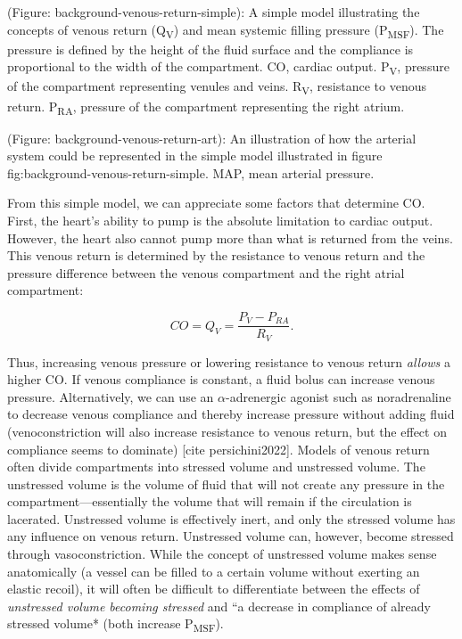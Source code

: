 \documentclass[a4paper, nobind]{templates/ociamthesis}
\begin{document}
(Figure: background-venous-return-simple): A simple model illustrating the concepts of venous return (Q\textsubscript{V}) and mean systemic filling pressure (P\textsubscript{MSF}). The pressure is defined by the height of the fluid surface and the compliance is proportional to the width of the compartment. CO, cardiac output. P\textsubscript{V}, pressure of the compartment representing venules and veins. R\textsubscript{V}, resistance to venous return. P\textsubscript{RA}, pressure of the compartment representing the right atrium.

(Figure: background-venous-return-art): An illustration of how the arterial system could be represented in the simple model illustrated in figure fig:background-venous-return-simple. MAP, mean arterial pressure.

From this simple model, we can appreciate some factors that determine CO. First, the heart's ability to pump is the absolute limitation to cardiac output. However, the heart also cannot pump more than what is returned from the veins. This venous return is determined by the resistance to venous return and the pressure difference between the venous compartment and the right atrial compartment:

\[
CO = Q_V = \frac{P_V - P_{RA}}{R_V}.
\]

Thus, increasing venous pressure or lowering resistance to venous return \emph{allows} a higher CO. If venous compliance is constant, a fluid bolus can increase venous pressure. Alternatively, we can use an \(\alpha\)-adrenergic agonist such as noradrenaline to decrease venous compliance and thereby increase pressure without adding fluid (venoconstriction will also increase resistance to venous return, but the effect on compliance seems to dominate) {[}cite persichini2022{]}. Models of venous return often divide compartments into stressed volume and unstressed volume. The unstressed volume is the volume of fluid that will not create any pressure in the compartment---essentially the volume that will remain if the circulation is lacerated. Unstressed volume is effectively inert, and only the stressed volume has any influence on venous return. Unstressed volume can, however, become stressed through vasoconstriction. While the concept of unstressed volume makes sense anatomically (a vessel can be filled to a certain volume without exerting an elastic recoil), it will often be difficult to differentiate between the effects of \emph{unstressed volume becoming stressed} and ``a decrease in compliance of already stressed volume* (both increase P\textsubscript{MSF}).
\end{document}
